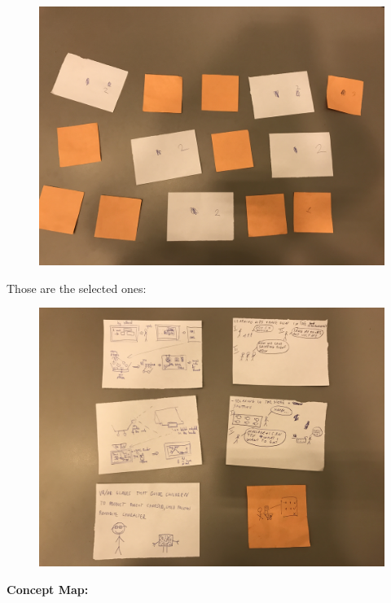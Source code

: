 \documentclass[a4paper,10pt,oneside]{scrreprt}
\begin{document}
				\begin{figure}[H]
					\centering
					\includegraphics[width=16cm, clip, trim={0em 20em 0em 35em}]{images/voting.JPG}
				\end{figure}
			
			\clearpage
			
			Those are the selected ones:
			
				\begin{figure}[H]
					\centering
					\includegraphics[width=15cm]{images/voting_post.JPG}
				\end{figure}
			

			\noindent \textbf{Concept Map:}\\
\end{document}
